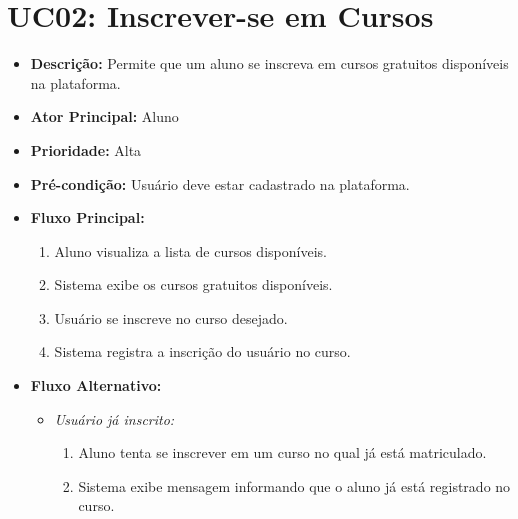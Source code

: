         \section*{UC02: Inscrever-se em Cursos}

        \begin{itemize}
            \item \textbf{Descrição:} Permite que um aluno se inscreva em cursos gratuitos disponíveis na plataforma.
            
            \item \textbf{Ator Principal:} Aluno
            
            \item \textbf{Prioridade:} Alta
            
            \item \textbf{Pré-condição:} Usuário deve estar cadastrado na plataforma.
            
            \item \textbf{Fluxo Principal:}
            \begin{enumerate}
                \item Aluno visualiza a lista de cursos disponíveis.
                \item Sistema exibe os cursos gratuitos disponíveis.
                \item Usuário se inscreve no curso desejado.
                \item Sistema registra a inscrição do usuário no curso.
            \end{enumerate}

            \item \textbf{Fluxo Alternativo:}
            \begin{itemize}
                \item \textit{Usuário já inscrito:}
                \begin{enumerate}
                    \item Aluno tenta se inscrever em um curso no qual já está matriculado.
                    \item Sistema exibe mensagem informando que o aluno já está registrado no curso.
                \end{enumerate}
            \end{itemize}
        \end{itemize}


